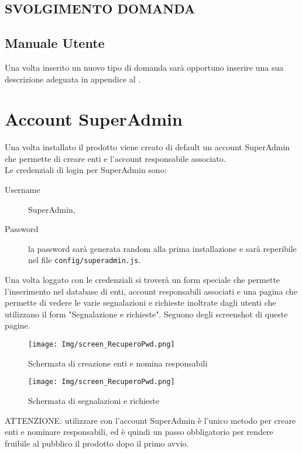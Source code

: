\documentclass[a4paper, titlepage]{article}
\begin{document}
	\subsection{SVOLGIMENTO DOMANDA}
	
	\subsection{Manuale Utente}
	Una volta inserito un nuovo tipo di domanda sarà opportuno inserire una sua descrizione adeguata in appendice al .
	
	\newpage
	\section{Account SuperAdmin} %
	Una volta installato il prodotto viene creato di default un account SuperAdmin che permette di creare enti e l'account responsabile associato. 
	\\ Le credenziali di login per SuperAdmin sono:
	\begin{description}
		\item[Username] SuperAdmin,
		\item[Password] la password sarà generata random alla prima installazione e sarà reperibile nel file \texttt{config/superadmin.js}.
	\end{description}
	Una volta loggato con le credenziali si troverà un form speciale che permette l'inserimento nel database di enti, account responsabili associati e una pagina che permette di vedere le varie segnalazioni e richieste inoltrate dagli utenti che utilizzano il form "Segnalazione e richieste". Seguono degli screenshot di queste pagine.
	
	\begin{figure}[!h]
		\centering
		\texttt{[image: Img/screen\_RecuperoPwd.png]}
		\caption{Schermata di creazione enti e nomina responsabili}
	\end{figure}
	
	\begin{figure}[!h]
		\centering
		\texttt{[image: Img/screen\_RecuperoPwd.png]}
		\caption{Schermata di segnalazioni e richieste}
	\end{figure}
	
	ATTENZIONE: utilizzare con l'account SuperAdmin è l'unico metodo per creare enti e nominare responsabili, ed è quindi un passo obbligatorio per rendere fruibile al pubblico il prodotto dopo il primo avvio.
	
\end{document}
